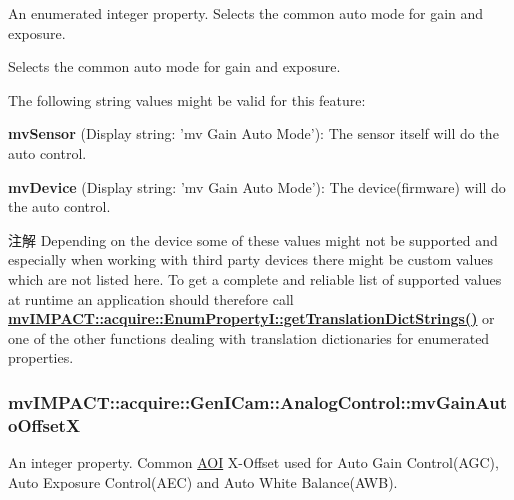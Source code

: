 An enumerated integer property. Selects the common auto mode for gain and exposure. 

Selects the common auto mode for gain and exposure.

The following string values might be valid for this feature\+:
\begin{DoxyItemize}
\item {\bfseries mv\+Sensor} (Display string\+: 'mv Gain Auto Mode')\+: The sensor itself will do the auto control.
\item {\bfseries mv\+Device} (Display string\+: 'mv Gain Auto Mode')\+: The device(firmware) will do the auto control.
\end{DoxyItemize}

\begin{DoxyNote}{注解}
Depending on the device some of these values might not be supported and especially when working with third party devices there might be custom values which are not listed here. To get a complete and reliable list of supported values at runtime an application should therefore call {\bfseries \hyperlink{classmv_i_m_p_a_c_t_1_1acquire_1_1_enum_property_i_a0ba6ccbf5ee69784d5d0b537924d26b6}{mv\+I\+M\+P\+A\+C\+T\+::acquire\+::\+Enum\+Property\+I\+::get\+Translation\+Dict\+Strings()}} or one of the other functions dealing with translation dictionaries for enumerated properties. 
\end{DoxyNote}
\hypertarget{classmv_i_m_p_a_c_t_1_1acquire_1_1_gen_i_cam_1_1_analog_control_aac47487b493423cf556dcb4b7e8ce53a}{
\subsubsection[{mv\+Gain\+Auto\+Offset\+X}]{ mv\+I\+M\+P\+A\+C\+T\+::acquire\+::\+Gen\+I\+Cam\+::\+Analog\+Control\+::mv\+Gain\+Auto\+Offset\+X}}\label{classmv_i_m_p_a_c_t_1_1acquire_1_1_gen_i_cam_1_1_analog_control_aac47487b493423cf556dcb4b7e8ce53a}


An integer property. Common \hyperlink{struct_a_o_i}{A\+O\+I} X-\/\+Offset used for Auto Gain Control(\+A\+G\+C), Auto Exposure Control(\+A\+E\+C) and Auto White Balance(\+A\+W\+B). 

